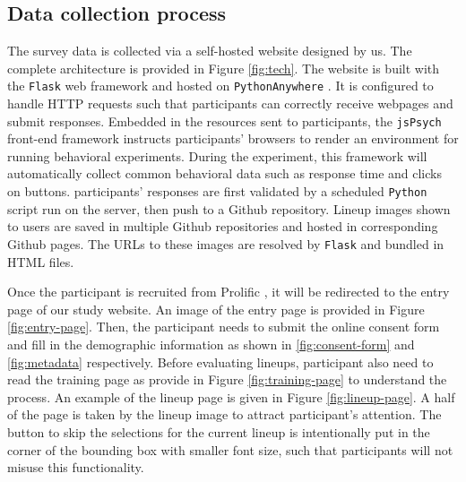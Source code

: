 \documentclass[]{interact}
\theoremstyle{plain}%
\theoremstyle{definition}
\theoremstyle{remark}
\begin{document}
\hypertarget{data-collection-process}{%
\subsection{Data collection process}\label{data-collection-process}}

The survey data is collected via a self-hosted website designed by us.
The complete architecture is provided in Figure \ref{fig:tech}. The
website is built with the \texttt{Flask} \citep{flask} web framework and
hosted on \texttt{PythonAnywhere} \citep{pythonanywhere}. It is
configured to handle HTTP requests such that participants can correctly
receive webpages and submit responses. Embedded in the resources sent to
participants, the \texttt{jsPsych} front-end framework \citep{jspsych}
instructs participants' browsers to render an environment for running
behavioral experiments. During the experiment, this framework will
automatically collect common behavioral data such as response time and
clicks on buttons. participants' responses are first validated by a
scheduled \texttt{Python} script run on the server, then push to a
Github repository. Lineup images shown to users are saved in multiple
Github repositories and hosted in corresponding Github pages. The URLs
to these images are resolved by \texttt{Flask} and bundled in HTML
files.

Once the participant is recruited from Prolific
\citep{palan2018prolific}, it will be redirected to the entry page of
our study website. An image of the entry page is provided in Figure
\ref{fig:entry-page}. Then, the participant needs to submit the online
consent form and fill in the demographic information as shown in
\ref{fig:consent-form} and \ref{fig:metadata} respectively. Before
evaluating lineups, participant also need to read the training page as
provide in Figure \ref{fig:training-page} to understand the process. An
example of the lineup page is given in Figure \ref{fig:lineup-page}. A
half of the page is taken by the lineup image to attract participant's
attention. The button to skip the selections for the current lineup is
intentionally put in the corner of the bounding box with smaller font
size, such that participants will not misuse this functionality.
\end{document}
